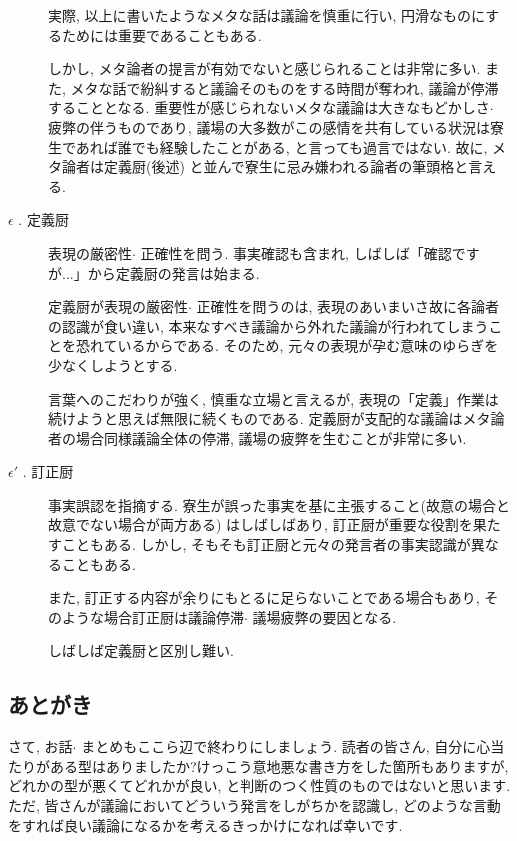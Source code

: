 \documentclass[10pt,b5jsbook,dvips,dvipdfmx,openany]{jsbook}
\theoremstyle{definition}
\begin{document}
\begin{description}
			実際, 以上に書いたようなメタな話は議論を慎重に行い, 円滑なものにするためには重要であることもある. 

			しかし, メタ論者の提言が有効でないと感じられることは非常に多い. また, メタな話で紛糾すると議論そのものをする時間が奪われ, 議論が停滞することとなる. 重要性が感じられないメタな議論は大きなもどかしさ$ \cdot $ 疲弊の伴うものであり, 議場の大多数がこの感情を共有している状況は寮生であれば誰でも経験したことがある, と言っても過言ではない. 故に, メタ論者は定義厨(後述) と並んで寮生に忌み嫌われる論者の筆頭格と言える. 


			\item[$ \epsilon $ . 定義厨]

			表現の厳密性$ \cdot $ 正確性を問う. 事実確認も含まれ, しばしば「確認ですが...」から定義厨の発言は始まる. 

			定義厨が表現の厳密性$ \cdot $ 正確性を問うのは, 表現のあいまいさ故に各論者の認識が食い違い, 本来なすべき議論から外れた議論が行われてしまうことを恐れているからである. そのため, 元々の表現が孕む意味のゆらぎを少なくしようとする. 

			言葉へのこだわりが強く, 慎重な立場と言えるが, 表現の「定義」作業は続けようと思えば無限に続くものである. 定義厨が支配的な議論はメタ論者の場合同様議論全体の停滞, 議場の疲弊を生むことが非常に多い. 


			\item[$ \epsilon ' $ . 訂正厨] 

			事実誤認を指摘する. 寮生が誤った事実を基に主張すること(故意の場合と故意でない場合が両方ある) はしばしばあり, 訂正厨が重要な役割を果たすこともある. しかし, そもそも訂正厨と元々の発言者の事実認識が異なることもある. 

			また, 訂正する内容が余りにもとるに足らないことである場合もあり, そのような場合訂正厨は議論停滞$ \cdot $ 議場疲弊の要因となる. 

			しばしば定義厨と区別し難い. 

			\end{description}

		\subsection{あとがき}
		さて, お話$ \cdot $ まとめもここら辺で終わりにしましょう. 
		読者の皆さん, 自分に心当たりがある型はありましたか?けっこう意地悪な書き方をした箇所もありますが, どれかの型が悪くてどれかが良い, と判断のつく性質のものではないと思います. ただ, 皆さんが議論においてどういう発言をしがちかを認識し, どのような言動をすれば良い議論になるかを考えるきっかけになれば幸いです. 
\end{document}
